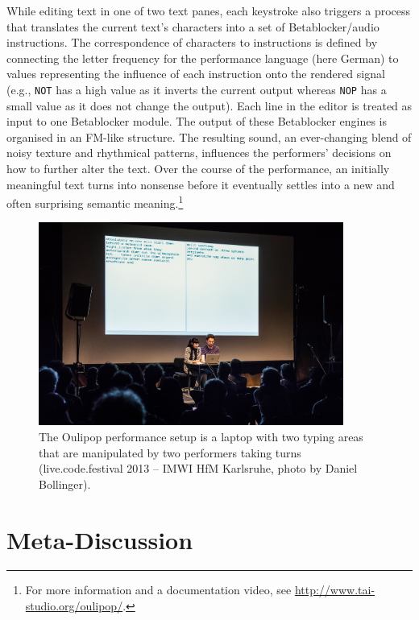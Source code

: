 \documentclass[letterpaper, 12pt]{article}
\begin{document}
While editing text in one of two text panes, each keystroke also triggers a process that translates the current text's characters into a set of Betablocker/audio instructions.
The correspondence of characters to instructions is defined by connecting the letter frequency for the performance language (here German) to values representing the influence of each instruction onto the rendered signal (e.g., \texttt{NOT} has a high value as it inverts the current output whereas \texttt{NOP} has a small value as it does not change the output).
Each line in the editor is treated as input to one Betablocker module.
The output of these Betablocker engines is organised in an FM-like structure.
The resulting sound, an ever-changing blend of noisy texture and rhythmical patterns, influences the performers' decisions on how to further alter the text.
Over the course of the performance, an initially meaningful text turns into nonsense before it eventually settles into a new and often surprising semantic meaning.\footnote{For more information and a documentation video, see \url{http://www.tai-studio.org/oulipop/}.}
\begin{figure}
	\centering
		\includegraphics[width=10cm]{20130420-live-code-fest-20}
	\caption{The Oulipop performance setup is a laptop with two typing areas that are manipulated by two performers taking turns (live.code.festival 2013 -- IMWI HfM Karlsruhe, photo by Daniel Bollinger).}
	\label{fig:fig_20120509-IMG_3278}
\end{figure}
\parskip 18pt

\section{Meta-Discussion}
\label{sec:meta}

\end{document}
